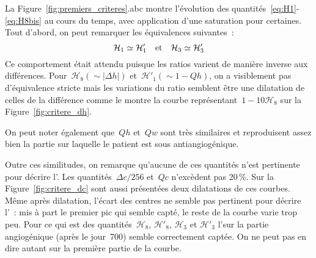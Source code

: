 \documentclass[main.tex]{subfiles}
\begin{document}
La Figure~\ref{fig:premiers_criteres}.abc montre l'évolution des quantités~\eqref{eq:H1}-\eqref{eq:H8bis} au cours du temps, avec application d'une saturation pour certaines. Tout d'abord, on peut remarquer les équivalences suivantes~:
\begin{equation}
\label{eq:equiv_diff_rapport}
\mathcal{H}_1 \simeq \mathcal{H}'_1  \quad {\rm et } \quad \mathcal{H}_3 \simeq \mathcal{H}'_3
\end{equation}
Ce comportement était attendu puisque les ratios varient de manière inverse aux différences. 
Pour~$\mathcal{H}_8 (\sim |\Delta h|)$ et~$\mathcal{H}'_1 (\sim 1-Qh)$, on a visiblement pas d'équivalence stricte mais les variations du ratio semblent être une dilatation de celles de la différence comme le montre la courbe représentant~$1-10\mathcal{H}_8$ sur la Figure~\ref{fig:critere_dh}.

On peut noter également que~$Qh$ et~$Qw$ sont très similaires et reproduisent assez bien la partie sur laquelle le patient est sous antiangiogénique. 



Outre ces similitudes, on remarque qu'aucune de ces quantités n'est pertinente pour décrire l'\hetero. Les quantités~$\Delta c/256$ et~$Qc$ n'excèdent pas 20\,\%. Sur la Figure~\ref{fig:critere_dc} sont aussi présentées deux dilatations de ces courbes. Même après dilatation, l'écart des centres ne semble pas pertinent pour décrire l'\hetero~: mis à part le premier pic qui semble capté, le reste de la courbe varie trop peu. 
Pour ce qui est des quantités~$\mathcal{H}_8$, $\mathcal{H}'_8$, $\mathcal{H}_3$ et $\mathcal{H}'_3$ l'\hetero sur la partie angiogénique (après le jour~700) semble correctement captée. On ne peut pas en dire autant sur la première partie de la courbe. 
\end{document}
